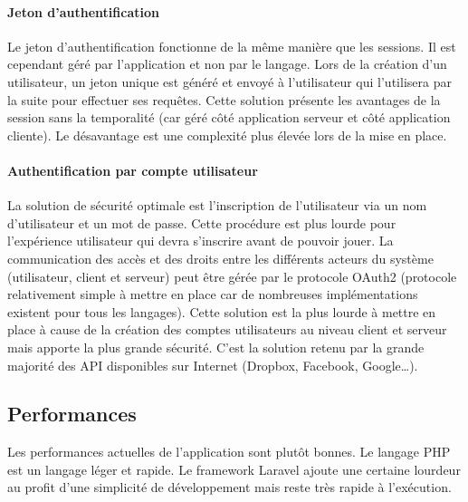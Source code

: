 
		\paragraph{Jeton d'authentification} %
		\label{par:jeton_d_authentification}

			Le jeton d'authentification fonctionne de la même manière que les sessions. Il est cependant géré par l'application et non par le langage. Lors de la création d'un utilisateur, un jeton unique est généré et envoyé à l'utilisateur qui l'utilisera par la suite pour effectuer ses requêtes. Cette solution présente les avantages de la session sans la temporalité (car géré côté application serveur et côté application cliente). Le désavantage est une complexité plus élevée lors de la mise en place.


		\paragraph{Authentification par compte utilisateur} %
		\label{par:authentification_par_compte_utilisateur}

			La solution de sécurité optimale est l'inscription de l'utilisateur via un nom d'utilisateur et un mot de passe. Cette procédure est plus lourde pour l'expérience utilisateur qui devra s'inscrire avant de pouvoir jouer. La communication des accès et des droits entre les différents acteurs du système (utilisateur, client et serveur) peut être gérée par le protocole OAuth2 (protocole relativement simple à mettre en place car de nombreuses implémentations existent pour tous les langages). Cette solution est la plus lourde à mettre en place à cause de la création des comptes utilisateurs au niveau client et serveur mais apporte la plus grande sécurité. C'est la solution retenu par la grande majorité des API disponibles sur Internet (Dropbox, Facebook, Google\dots).



	\subsection{Performances} %
	\label{sub:performances}

		Les performances actuelles de l'application sont plutôt bonnes. Le langage PHP est un langage léger et rapide. Le framework Laravel ajoute une certaine lourdeur au profit d'une simplicité de développement mais reste très rapide à l'exécution.\\

